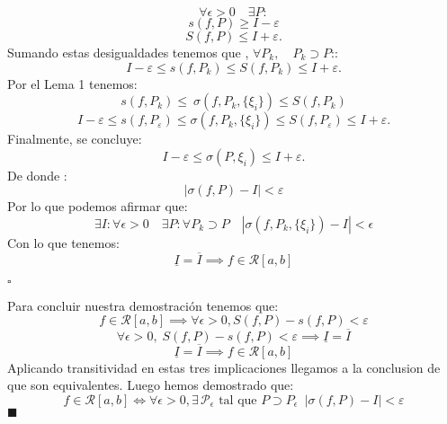 \documentclass[10pt]{article}
\begin{document}
\begin{equation}
	\forall \epsilon > 0  \quad\exists P: 
\end{equation}
\begin{equation}
    s(f, P) \geq I - \varepsilon
\end{equation}
\begin{equation}
    S(f, P) \leq  I + \varepsilon.
\end{equation}
Sumando estas desigualdades tenemos que  , $\forall P_k, \quad P_k \supset P$::
\begin{equation}
    I - \varepsilon \leq s(f,P_k) \leq S(f, P_k) \leq I + \varepsilon.
\end{equation}
Por el Lema 1 tenemos:
\begin{equation}
  s(f,P_k)  \leq \ \sigma (f,P_k,\{\xi_i\})  \leq S(f, P_k) 
\end{equation}
\begin{equation}
    I - \varepsilon \leq s(f, P_\varepsilon)  \leq \sigma (f,P_k,\{\xi_i\}) \leq S(f, P_\varepsilon) \leq I + \varepsilon.
\end{equation}
Finalmente, se concluye:
\begin{equation}
    I - \varepsilon\leq \sigma(P, \xi_i) \leq  I + \varepsilon.
\end{equation}
De donde :
\begin{equation}
    |\sigma(f, P) - I| < \varepsilon
\end{equation}
 Por lo que podemos afirmar que:
 	\begin{equation}
 	    \exists I:\forall\epsilon >0 \quad\exists P: \forall P_k \supset P \quad|\sigma (f,P_k,\{\xi_i\}) - I| < \epsilon
 	\end{equation}
Con lo que tenemos:
\begin{equation}
\underline{I} =\overline{I}\implies
   f \in \mathcal{R}[a, b] 
\end{equation}

            \begin{flushright}
				$\square$
			\end{flushright}

 Para concluir nuestra demostración tenemos que:
 \begin{equation}
     f \in \mathcal{R}[a, b] \implies \forall \epsilon > 0,  S(f,P)-s(f,P) < \varepsilon
\end{equation}
\begin{equation}
\forall \epsilon > 0,\;  S(f,P)-s(f,P) < \varepsilon \implies \underline{I} =\overline{I}
\end{equation}\begin{equation}
\underline{I} =\overline{I}\implies
   f \in \mathcal{R}[a, b] 
\end{equation}
Aplicando transitividad en estas tres implicaciones llegamos a la conclusion de que son equivalentes. Luego hemos demostrado que:
\begin{equation}
    f \in \mathcal{R}[a, b] \iff \forall \epsilon > 0, \exists \, \mathcal{P}_\epsilon \text{  tal que } P \supset P_\epsilon \ \;  |\sigma(f, P) - I| < \varepsilon

\end{equation}
 \hfill \(\blacksquare\)
\end{document}
